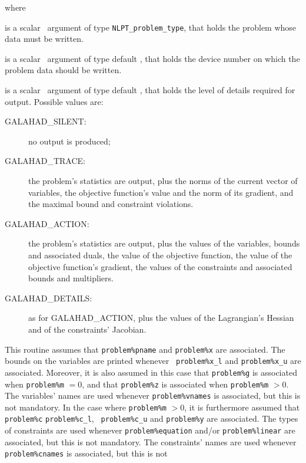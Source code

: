 \documentclass{galahad}
\newcommand{\sym}{\sf\small}
\begin{document}
\noindent where
\begin{description}
 is a scalar \intentin\ argument of type {\tt NLPT\_problem\_type},
that holds the problem whose data must be written.

 is a scalar \intentin\ argument of type default \integer, that
holds the device number on which the problem data should be written.

 is a scalar \intentin\ argument of type default \integer,
that holds the level of details required for output. Possible values are:
\begin{description}
\item[\sym GALAHAD\_SILENT:] no output is produced;
\item[\sym GALAHAD\_TRACE:] the problem's statistics are output, plus the
norms of the current vector of variables, the objective function's value and
the norm of its gradient, and the maximal bound and constraint violations.
\item[\sym GALAHAD\_ACTION:] the problem's statistics are output, plus the
values of the variables, bounds and associated duals, the value of the
objective function, the value of the objective function's gradient, the values
of the constraints and associated bounds and multipliers.
\item[\sym GALAHAD\_DETAILS:] as for {\sym GALAHAD\_ACTION}, plus the values
of the Lagrangian's Hessian and of the constraints' Jacobian.
\end{description}

\noindent
This routine assumes that {\tt problem\%pname} and {\tt problem\%x} are
associated. The bounds on the variables are printed whenever {\tt
problem\%x\_l} and {\tt problem\%x\_u} are associated. Moreover, it is also
assumed in this case that {\tt problem\%g} is associated when {\tt problem\%m}
$= 0$, and that {\tt problem\%z} is associated when {\tt problem\%m} $> 0$.
The variables' names are used whenever {\tt problem\%vnames} is associated,
but this is not mandatory. In the case where {\tt problem\%m} $>0$, it is
furthermore assumed that {\tt problem\%c} {\tt problem\%c\_l}, {\tt
problem\%c\_u} and {\tt problem\%y} are associated.  The types of constraints
are used whenever {\tt problem\%equation} and/or {\tt problem\%linear} are
associated, but this is not mandatory.  The constraints' names are used
whenever {\tt problem\%cnames} is associated, but this is not

\end{description}
\end{document}

